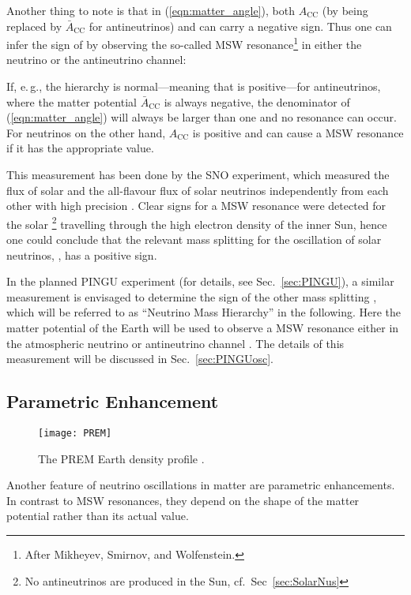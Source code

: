 Another thing to note is that in (\ref{eqn:matter_angle}), both $A_\mathrm{CC}$ 
(by being replaced by $\bar{A}_\mathrm{CC}$ for antineutrinos)
and \dm{} can carry a negative sign. Thus one can infer the sign of \dm{} by
observing the so-called MSW resonance\footnote{After Mikheyev, Smirnov, and
Wolfenstein.} in either the neutrino or the antineutrino channel:

If, e.\,g., the hierarchy is normal---meaning that \dm{} is positive---for 
antineutrinos, where the matter potential $\bar{A}_\mathrm{CC}$ is always 
negative, the denominator of (\ref{eqn:matter_angle}) will always be larger 
than one and no resonance can occur. For neutrinos on the other hand, 
$A_\mathrm{CC}$ is positive and can cause a MSW resonance if it has the 
appropriate value.

This measurement has been
done by the SNO experiment, which measured the flux of solar \nue and the
all-flavour flux of solar neutrinos independently from each other with high
precision \cite{SNOosc}. Clear signs for a MSW resonance were detected for the
solar \nue\footnote{No antineutrinos are produced in the Sun, cf.\
Sec~\ref{sec:SolarNus}} travelling through the high electron density of the
inner Sun, hence one could conclude that the relevant mass splitting for
the oscillation of solar neutrinos, \dm{21}, has a positive sign.

In the planned PINGU experiment (for details, see Sec.~\ref{sec:PINGU}), a
similar measurement is envisaged to determine the sign of the other mass
splitting \dm{31}, which will be referred to as ``Neutrino Mass Hierarchy'' in
the following. Here the matter potential of the Earth will be used to
observe a MSW resonance either in the atmospheric neutrino or antineutrino
channel \cite{Akhmedov, LoI}. The details of this measurement will be discussed
in Sec.~\ref{sec:PINGUosc}.

\subsection{Parametric Enhancement}
\label{sec:ParamRes}

\begin{figure}[th]
 \centering
 \texttt{[image: PREM]}
 \caption{The PREM Earth density profile \cite{PREM}.}
 \label{fig:PREM}
\end{figure}

Another feature of neutrino oscillations in matter are parametric enhancements. 
In contrast to MSW resonances, they depend on the shape of the matter potential 
rather than its actual value.

